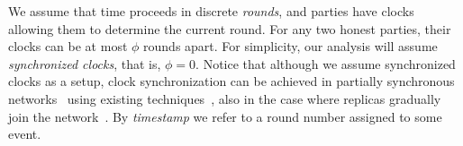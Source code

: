 

We assume that time proceeds in discrete \emph{rounds}, and parties have clocks allowing them to determine the current round.
For any two honest parties, their clocks can be at most $\phi$ rounds apart.
For simplicity, our analysis will assume \emph{synchronized clocks}, that is, $\phi = 0$.
Notice that although we assume synchronized clocks as a setup, clock synchronization can be achieved in partially synchronous networks~\cite{psync} using existing techniques~\cite{clockoverview}, also in the case where replicas gradually join the network~\cite{bootclocksync}.
By \emph{timestamp} we refer to a round number assigned to some event.

